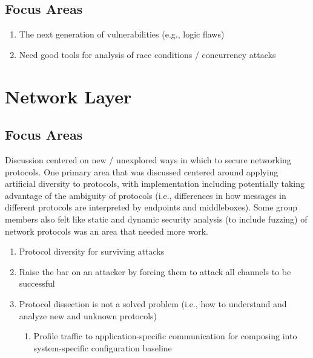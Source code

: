 \documentclass[11pt]{article}
\begin{document}
\subsection{Focus Areas}

\begin{enumerate}
	\item The next generation of vulnerabilities (e.g., logic flaws)
	\item Need good tools for analysis of race conditions / concurrency attacks
\end{enumerate}

\section{Network Layer}

\subsection{Focus Areas}

Discussion centered on new / unexplored ways in which to secure networking
protocols.  One primary area that was discussed centered around
applying artificial diversity to protocols,  with implementation
including potentially taking advantage of the ambiguity of protocols
(i.e., differences in how messages in different protocols are
interpreted by endpoints and middleboxes).  Some group members also
felt like static and dynamic security analysis (to include fuzzing) of
network protocols was an area that needed more work.

\begin{enumerate}
  
  \item Protocol diversity for surviving attacks

  \item Raise the bar on an attacker by forcing them to attack all
  channels to be successful

  \item Protocol dissection is not a solved problem (i.e., how to
  understand and analyze new and unknown protocols)

  \begin{enumerate}
  	\item Profile traffic to application-specific communication for
  	composing into system-specific configuration baseline
  \end{enumerate}

\end{enumerate}
\end{document}
